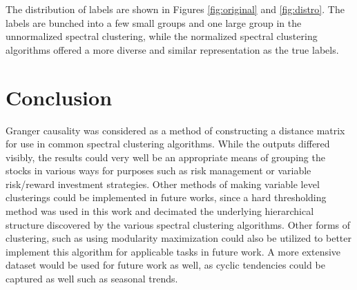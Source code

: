\documentclass[conference]{IEEEtran}
\begin{document}
The distribution of labels are shown in Figures \ref{fig:original} and \ref{fig:distro}. The labels are bunched into a few small groups and one large group in the unnormalized spectral clustering, while the normalized spectral clustering algorithms offered a more diverse and similar representation as the true labels.

\section{Conclusion}
Granger causality was considered as a method of constructing a distance matrix for use in common spectral clustering algorithms. While the outputs differed visibly, the results could very well be an appropriate means of grouping the stocks in various ways for purposes such as risk management or variable risk/reward investment strategies. Other methods of making variable level clusterings could be implemented in future works, since a hard thresholding method was used in this work and decimated the underlying hierarchical structure discovered by the various spectral clustering algorithms. Other forms of clustering, such as using modularity maximization could also be utilized to better implement this algorithm for applicable tasks in future work. A more extensive dataset would be used for future work as well, as cyclic tendencies could be captured as well such as seasonal trends.



\end{document}
